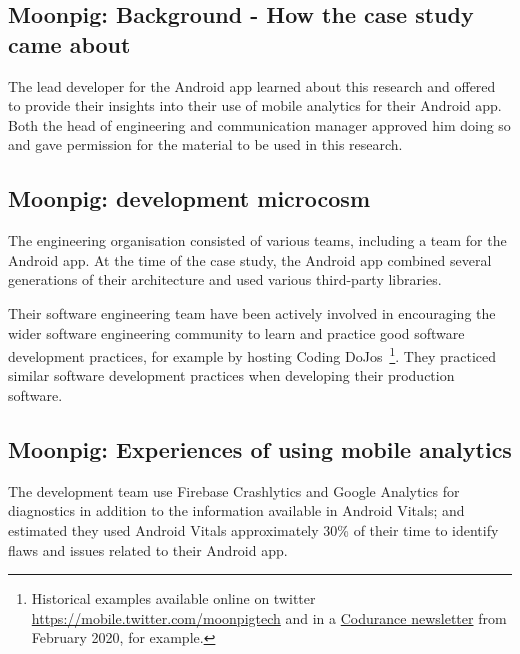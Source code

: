 \subsection{Moonpig: Background - How the case study came about}
The lead developer for the Android app learned about this research and offered to provide their insights into their use of mobile analytics for their Android app. Both the head of engineering and communication manager approved him doing so and gave permission for the material to be used in this research.

\subsection{Moonpig: development microcosm}
The engineering organisation consisted of various teams, including a team for the Android app. At the time of the case study, the Android app combined several generations of their architecture and used various third-party libraries.

Their software engineering team have been actively involved in encouraging the wider software engineering community to learn and practice good software development practices, for example by hosting Coding DoJos~\footnote{Historical examples available online on twitter \url{https://mobile.twitter.com/moonpigtech} and in a \href{https://www.codurance.com/publications/newsletters/2020-02-13-newsletter}{Codurance newsletter} from February 2020, for example.}. They practiced similar software development practices when developing their production software.

\subsection{Moonpig: Experiences of using mobile analytics}
The development team use Firebase Crashlytics and Google Analytics for diagnostics in addition to the information available in Android Vitals; and estimated they used Android Vitals approximately 30\% of their time to identify flaws and issues related to their Android app.

